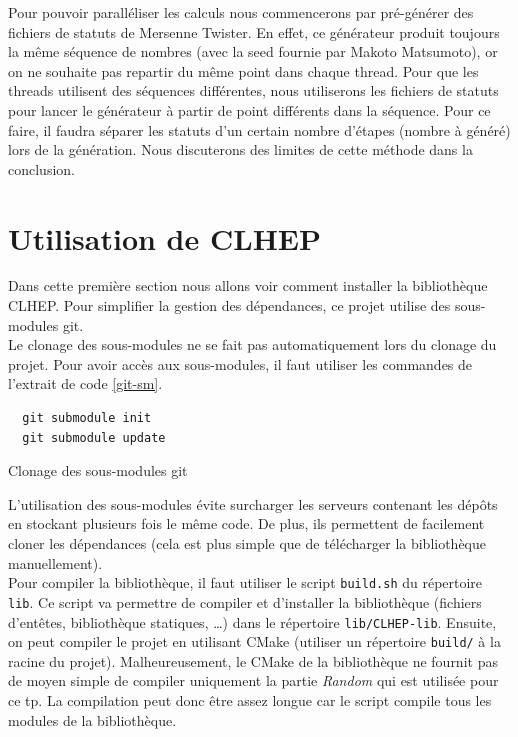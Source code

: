 \documentclass[a4paper]{article}
\begin{document}
Pour pouvoir paralléliser les calculs nous commencerons par pré-générer des
fichiers de statuts de Mersenne Twister. En effet, ce générateur produit
toujours la même séquence de nombres (avec la seed fournie par Makoto
Matsumoto), or on ne souhaite pas repartir du même point dans chaque thread.
Pour que les threads utilisent des séquences différentes, nous utiliserons les
fichiers de statuts pour lancer le générateur à partir de point différents dans
la séquence. Pour ce faire, il faudra séparer les statuts d'un certain nombre
d'étapes (nombre à généré) lors de la génération. Nous discuterons des limites
de cette méthode dans la conclusion.

\clearpage

\section{Utilisation de CLHEP}

Dans cette première section nous allons voir comment installer la bibliothèque
CLHEP. Pour simplifier la gestion des dépendances, ce projet utilise des
sous-modules git.\\

Le clonage des sous-modules ne se fait pas automatiquement lors du clonage du
projet. Pour avoir accès aux sous-modules, il faut utiliser les commandes
de l'extrait de code \ref{git-sm}.

\begin{listing}[ht!]
\begin{verbatim}
  git submodule init
  git submodule update
\end{verbatim}
\caption{Clonage des sous-modules git}
\label{git-sm}
\end{listing}

L'utilisation des sous-modules évite surcharger les serveurs contenant les
dépôts en stockant plusieurs fois le même code. De plus, ils permettent de
facilement cloner les dépendances (cela est plus simple que de télécharger la
bibliothèque manuellement).\\

Pour compiler la bibliothèque, il faut utiliser le script \texttt{build.sh}
du répertoire \texttt{lib}. Ce script va permettre de compiler et d'installer
la bibliothèque (fichiers d'entêtes, bibliothèque statiques, \dots) dans le
répertoire \texttt{lib/CLHEP-lib}. Ensuite, on peut compiler le projet en
utilisant CMake (utiliser un répertoire \texttt{build/} à la racine du
projet). Malheureusement, le CMake de la bibliothèque ne fournit pas de moyen
simple de compiler uniquement la partie \textit{Random} qui est utilisée pour ce
tp. La compilation peut donc être assez longue car le script compile tous les
modules de la bibliothèque.
\end{document}
